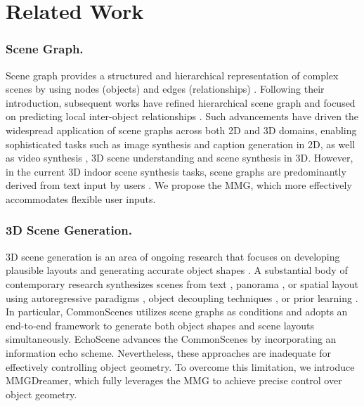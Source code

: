 \section{Related Work}
\subsubsection{Scene Graph.}
Scene graph provides a structured and hierarchical representation of complex scenes by using nodes (objects) and edges (relationships) \cite{zhou2019scenegraphnet}. 
Following their introduction, subsequent works have refined hierarchical scene graph \cite{rosinol20203d} and focused on predicting local inter-object relationships \cite{koch2024lang3dsg,liao2024gentkg}.
Such advancements have driven the widespread application of scene graphs across both 2D and 3D domains, enabling sophisticated tasks such as image synthesis \cite{johnson2018image, wu2023scene} and caption generation \cite{basioti2024cic} in 2D, as well as video synthesis \cite{cong2023ssgvs}, 3D scene understanding \cite{wald2020learning} and scene synthesis \cite{para2021generative} in 3D. 
However, in the current 3D indoor scene synthesis tasks, scene graphs are predominantly derived from text input by users \cite{strader2024indoor}. We propose the MMG, which more effectively accommodates flexible user inputs.

\subsubsection{3D Scene Generation.}
3D scene generation is an area of ongoing research that focuses on developing plausible layouts \cite{engelmann2021points} and generating accurate object shapes \cite{xu2023discoscene}.
A substantial body of contemporary research synthesizes scenes from text \cite{fang2023ctrl}, panorama \cite{wang2023perf, hara2024magritte}, or spatial layout \cite{yan2024frankenstein, jyothi2019layoutvae} using autoregressive paradigms \cite{wang2021sceneformer}, object decoupling techniques \cite{zhang2024style, epstein2024disentangled}, or prior learning \cite{hollein2023text2room}.
In particular, CommonScenes \cite{zhai2024commonscenes} utilizes scene graphs as conditions and adopts an end-to-end framework to generate both object shapes and scene layouts simultaneously. 
EchoScene \cite{zhai2024echoscene} advances the CommonScenes by incorporating an information echo scheme.
Nevertheless, these approaches are inadequate for effectively controlling object geometry. To overcome this limitation, we introduce MMGDreamer, which fully leverages the MMG to achieve precise control over object geometry.

